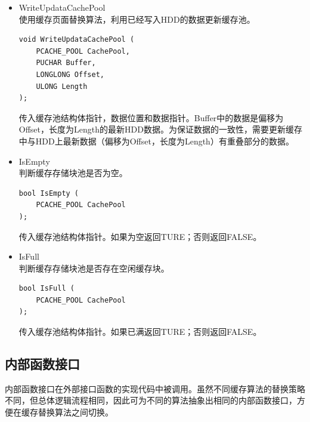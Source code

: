 \begin{itemize}
\item WriteUpdataCachePool
\\使用缓存页面替换算法，利用已经写入HDD的数据更新缓存池。
\begin{lstlisting}
void WriteUpdataCachePool (
    PCACHE_POOL CachePool,
    PUCHAR Buffer,
    LONGLONG Offset,
    ULONG Length
);
\end{lstlisting}
传入缓存池结构体指针，数据位置和数据指针。Buffer中的数据是偏移为Offset，长度为Length的最新HDD数据。为保证数据的一致性，需要更新缓存中与HDD上最新数据（偏移为Offset，长度为Length）有重叠部分的数据。

\item IsEmpty
\\判断缓存存储块池是否为空。
\begin{lstlisting}
bool IsEmpty (
    PCACHE_POOL CachePool
);
\end{lstlisting}
传入缓存池结构体指针。如果为空返回TURE；否则返回FALSE。

\item IsFull
\\判断缓存存储块池是否存在空闲缓存块。
\begin{lstlisting}
bool IsFull (
    PCACHE_POOL CachePool
);
\end{lstlisting}
传入缓存池结构体指针。如果已满返回TURE；否则返回FALSE。

\end{itemize}

\subsection{内部函数接口}

内部函数接口在外部接口函数的实现代码中被调用。虽然不同缓存算法的替换策略不同，但总体逻辑流程相同，因此可为不同的算法抽象出相同的内部函数接口，方便在缓存替换算法之间切换。

